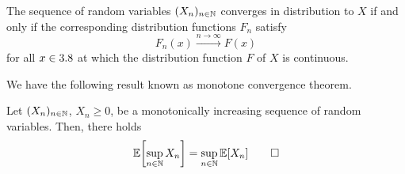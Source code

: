 \begin{fact}\label{fact:convergence-in-distribution-distribution-functions}
The sequence of random variables $(X_n)_{n \in \mathbb{N}}$ converges in distribution to $X$ if and only if the corresponding distribution functions $F_n$ satisfy
\[
F_n(x)
\xrightarrow{n \to \infty}
F(x)
\]
for all $x \in 3.8$ at which the distribution function $F$ of $X$ is continuous.
\end{fact}

We have the following result known as monotone convergence theorem.

\begin{theorem}\label{thm:monotone-convergence}
Let $(X_n)_{n \in \mathbb{N}}$, $X_n \geq 0$, be a monotonically increasing sequence of random variables.
Then, there holds
\begin{equation}\label{eq:monotone-convergence}
\operatorname{\mathbb{E}}\biggl[\sup_{n \in \mathbb{N}} X_n\biggr]
=
\sup_{n \in \mathbb{N}}\operatorname{\mathbb{E}}[X_n]
\qedhere
\end{equation}
\end{theorem}
